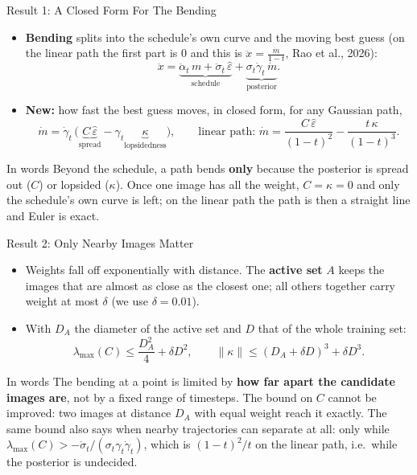 \documentclass[aspectratio=169]{beamer}
\newcommand{\hl}[1]{\textcolor{coolpurple}{\textbf{#1}}}
\newcommand{\eps}{\hat\varepsilon}
\begin{document}
	\begin{frame}{Result 1: A Closed Form For The Bending}
		\small
		\begin{itemize}
			\item \hl{Bending} splits into the schedule's own curve and the moving best guess (on the linear path the first part is $0$ and this is $\ddot x = \frac{\dot m}{1 - t}$, Rao et al., 2026):
			$$ \ddot x = \underbrace{\ddot\alpha_t\,m + \ddot\sigma_t\,\eps}_{\text{schedule}} + \underbrace{\sigma_t\dot\gamma_t\,\dot m}_{\text{posterior}}. $$
			\item \hl{New:} how fast the best guess moves, in closed form, for any Gaussian path,
			$$ \dot m = \dot\gamma_t\,\big(\underbrace{C\,\eps}_{\text{spread}} - \gamma_t \underbrace{\kappa}_{\text{lopsidedness}}\big), \qquad \text{linear path: } \dot m = \frac{C\,\eps}{(1 - t)^2} - \frac{t\,\kappa}{(1 - t)^3}. $$
		\end{itemize}
		\vspace{-0.4em}
		\begin{block}{In words}
			\footnotesize Beyond the schedule, a path bends \hl{only} because the posterior is spread out ($C$) or lopsided ($\kappa$). Once one image has all the weight, $C = \kappa = 0$ and only the schedule's own curve is left; on the linear path the path is then a straight line and Euler is exact.
		\end{block}
	\end{frame}

	\begin{frame}{Result 2: Only Nearby Images Matter}
		\small
		\begin{itemize}
			\item Weights fall off exponentially with distance. The \hl{active set} $A$ keeps the images that are almost as close as the closest one; all others together carry weight at most $\delta$ (we use $\delta = 0.01$).
			\item With $D_A$ the diameter of the active set and $D$ that of the whole training set:
			$$ \lambda_{\max}(C) \le \frac{D_A^2}{4} + \delta D^2, \qquad \|\kappa\| \le (D_A + \delta D)^3 + \delta D^3 . $$
		\end{itemize}
		\begin{block}{In words}
			\footnotesize The bending at a point is limited by \hl{how far apart the candidate images are}, not by a fixed range of timesteps. The bound on $C$ cannot be improved: two images at distance $D_A$ with equal weight reach it exactly. The same bound also says when nearby trajectories can separate at all: only while $\lambda_{\max}(C) > -\dot\sigma_t / (\sigma_t\gamma_t\dot\gamma_t)$, which is $(1 - t)^2/t$ on the linear path, i.e.\ while the posterior is undecided.
		\end{block}
	\end{frame}
\end{document}

